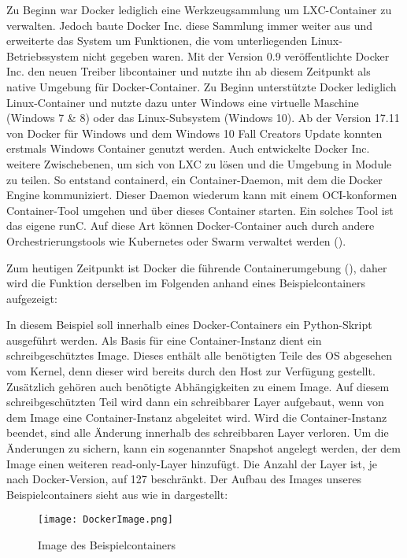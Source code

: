 Zu Beginn war Docker lediglich eine Werkzeugsammlung um \ac{LXC}-Container zu verwalten. Jedoch baute Docker Inc. diese Sammlung immer weiter aus und erweiterte das System um Funktionen, die vom unterliegenden Linux-Betriebssystem nicht gegeben waren. Mit der Version 0.9 veröffentlichte Docker Inc. den neuen Treiber libcontainer und nutzte ihn ab diesem Zeitpunkt als native Umgebung für Docker-Container. \citep{dockerblog2} Zu Beginn unterstützte Docker lediglich Linux-Container und nutzte dazu unter Windows eine virtuelle Maschine (Windows 7 \& 8) oder das Linux-Subsystem (Windows 10). Ab der Version 17.11 von Docker für Windows und dem Windows 10 Fall Creators Update konnten erstmals Windows Container genutzt werden. \citep{dockerblogwin} Auch entwickelte Docker Inc. weitere Zwischebenen, um sich von \ac{LXC} zu lösen und die Umgebung in Module zu teilen. So entstand containerd, ein Container-Daemon, mit dem die Docker Engine kommuniziert. Dieser Daemon wiederum kann mit einem OCI-konformen Container-Tool umgehen und über dieses Container starten. Ein solches Tool ist das eigene runC. Auf diese Art können Docker-Container auch durch andere Orchestrierungstools wie Kubernetes oder Swarm verwaltet werden (\Vgl {}). \citep{Buch}

Zum heutigen Zeitpunkt ist Docker die führende Containerumgebung (\Vgl {}), daher wird die Funktion derselben im Folgenden anhand eines Beispielcontainers aufgezeigt:

In diesem Beispiel soll innerhalb eines Docker-Containers ein Python-Skript ausgeführt werden. Als Basis für eine Container-Instanz dient ein schreibgeschütztes Image. Dieses enthält alle benötigten Teile des OS abgesehen vom Kernel, denn dieser wird bereits durch den Host zur Verfügung gestellt. Zusätzlich gehören auch benötigte Abhängigkeiten zu einem Image. Auf diesem schreibgeschützten Teil wird dann ein schreibbarer Layer aufgebaut, wenn von dem Image eine Container-Instanz abgeleitet wird. Wird die Container-Instanz beendet, sind alle Änderung innerhalb des schreibbaren Layer verloren. Um die Änderungen zu sichern, kann ein sogenannter Snapshot angelegt werden, der dem Image einen weiteren read-only-Layer hinzufügt. Die Anzahl der Layer ist, je nach Docker-Version, auf 127 beschränkt. \citep{Buch, dockermanual} Der Aufbau des Images unseres Beispielcontainers sieht aus wie in  dargestellt:

\begin{figure}[h]
    \begin{center}
        \texttt{[image: DockerImage.png]}
    \end{center}
    \caption[Image des Beispielcontainers]{Image des Beispielcontainers}
    \label{fig:docker1}
    \end{figure}


